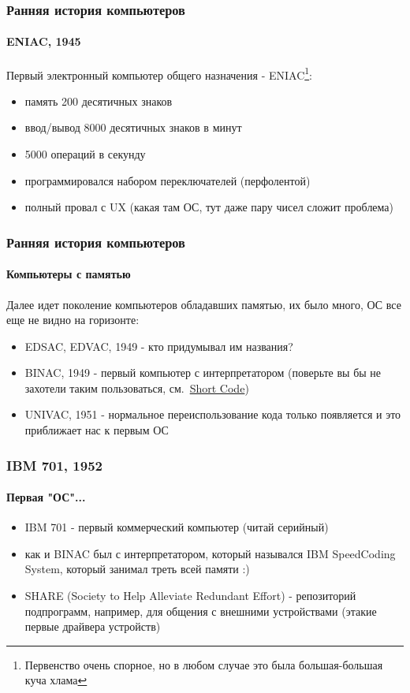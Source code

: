 \begin{frame}
\frametitle{Ранняя история компьютеров}
\framesubtitle{ENIAC, 1945}

Первый электронный компьютер общего назначения - ENIAC\footnote{Первенство очень
спорное, но в любом случае это была большая-большая куча хлама}:
\begin{itemize}
  \item память 200 десятичных знаков
  \item ввод/вывод 8000 десятичных знаков в минут
  \item 5000 операций в секунду
  \item программировался набором переключателей (перфолентой)
  \item полный провал с UX (какая там ОС, тут даже пару чисел сложит проблема)
\end{itemize}

\end{frame}

\begin{frame}
\frametitle{Ранняя история компьютеров}
\framesubtitle{Компьютеры с памятью}

Далее идет поколение компьютеров обладавших памятью, их было много, ОС все еще
не видно на горизонте:
\begin{itemize}
  \item EDSAC, EDVAC, 1949 - кто придумывал им названия?
  \item BINAC, 1949 - первый компьютер с интерпретатором (поверьте вы бы не
        захотели таким пользоваться, см.~\href{https://en.wikipedia.org/wiki/Short_Code_(computer_language)}{Short Code})
  \item UNIVAC, 1951 - нормальное переиспользование кода только появляется и
        это приближает нас к первым ОС
\end{itemize}

\end{frame}

\begin{frame}
\frametitle{IBM 701, 1952}
\framesubtitle{Первая "ОС"...}

\begin{itemize}
  \item IBM 701 - первый коммерческий компьютер (читай серийный)
  \item как и BINAC был с интерпретатором, который назывался IBM SpeedCoding
        System, который занимал треть всей памяти :)
  \item SHARE (Society to Help Alleviate Redundant Effort) - репозиторий
        подпрограмм, например, для общения с внешними устройствами (этакие
        первые драйвера устройств)
\end{itemize}

\end{frame}

